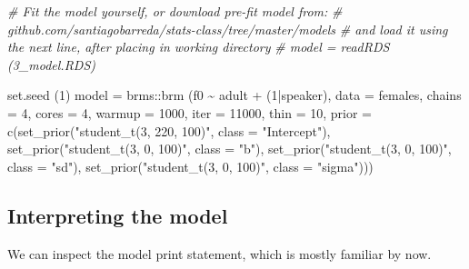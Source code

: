 \documentclass[
]{book}
\newenvironment{Shaded}{\begin{snugshade}}{\end{snugshade}}
\newcommand{\AttributeTok}[1]{\textcolor[rgb]{0.77,0.63,0.00}{#1}}
\newcommand{\CommentTok}[1]{\textcolor[rgb]{0.56,0.35,0.01}{\textit{#1}}}
\newcommand{\DecValTok}[1]{\textcolor[rgb]{0.00,0.00,0.81}{#1}}
\newcommand{\FunctionTok}[1]{\textcolor[rgb]{0.00,0.00,0.00}{#1}}
\newcommand{\NormalTok}[1]{#1}
\newcommand{\OtherTok}[1]{\textcolor[rgb]{0.56,0.35,0.01}{#1}}
\newcommand{\SpecialCharTok}[1]{\textcolor[rgb]{0.00,0.00,0.00}{#1}}
\newcommand{\StringTok}[1]{\textcolor[rgb]{0.31,0.60,0.02}{#1}}
\begin{document}
\begin{Shaded}
\begin{Highlighting}[]
\CommentTok{\# Fit the model yourself, or download pre{-}fit model from: }
\CommentTok{\# github.com/santiagobarreda/stats{-}class/tree/master/models}
\CommentTok{\# and load it using the next line, after placing in working directory}
\CommentTok{\# model = readRDS (\textquotesingle{}3\_model.RDS\textquotesingle{})}

\FunctionTok{set.seed}\NormalTok{ (}\DecValTok{1}\NormalTok{)}
\NormalTok{model }\OtherTok{=}  
\NormalTok{  brms}\SpecialCharTok{::}\FunctionTok{brm}\NormalTok{ (f0 }\SpecialCharTok{\textasciitilde{}}\NormalTok{ adult }\SpecialCharTok{+}\NormalTok{ (}\DecValTok{1}\SpecialCharTok{|}\NormalTok{speaker), }\AttributeTok{data =}\NormalTok{ females, }\AttributeTok{chains =} \DecValTok{4}\NormalTok{, }\AttributeTok{cores =} \DecValTok{4}\NormalTok{,}
       \AttributeTok{warmup =} \DecValTok{1000}\NormalTok{, }\AttributeTok{iter =} \DecValTok{11000}\NormalTok{, }\AttributeTok{thin =} \DecValTok{10}\NormalTok{,}
       \AttributeTok{prior =} \FunctionTok{c}\NormalTok{(}\FunctionTok{set\_prior}\NormalTok{(}\StringTok{"student\_t(3, 220, 100)"}\NormalTok{, }\AttributeTok{class =} \StringTok{"Intercept"}\NormalTok{),}
                 \FunctionTok{set\_prior}\NormalTok{(}\StringTok{"student\_t(3, 0, 100)"}\NormalTok{, }\AttributeTok{class =} \StringTok{"b"}\NormalTok{),}
                 \FunctionTok{set\_prior}\NormalTok{(}\StringTok{"student\_t(3, 0, 100)"}\NormalTok{, }\AttributeTok{class =} \StringTok{"sd"}\NormalTok{),}
                 \FunctionTok{set\_prior}\NormalTok{(}\StringTok{"student\_t(3, 0, 100)"}\NormalTok{, }\AttributeTok{class =} \StringTok{"sigma"}\NormalTok{)))}
\end{Highlighting}
\end{Shaded}

\hypertarget{interpreting-the-model}{%
\subsection{Interpreting the model}\label{interpreting-the-model}}

We can inspect the model print statement, which is mostly familiar by now.
\end{document}
